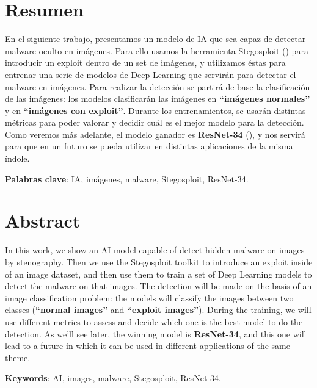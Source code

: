 \chapter{Resumen}

En el siguiente trabajo, presentamos un modelo de \ac{IA} que sea capaz de detectar malware oculto en imágenes. Para ello usamos la herramienta Stegosploit (\cite{stegosploit}) para introducir un exploit dentro de un set de imágenes, y utilizamos éstas para entrenar una serie de modelos de Deep Learning que servirán para detectar el malware en imágenes. Para realizar la detección se partirá de base la clasificación de las imágenes: los modelos clasificarán las imágenes en \textbf{``imágenes normales''} y en \textbf{``imágenes con exploit''}. Durante los entrenamientos, se usarán distintas métricas para poder valorar y decidir cuál es el mejor modelo para la detección. Como veremos más adelante, el modelo ganador es \textbf{ResNet-34} (\cite{resnet34}), y nos servirá para que en un futuro se pueda utilizar en distintas aplicaciones de la misma índole. %



\vspace{0.5cm}

\textbf{Palabras clave}: \ac{IA}, imágenes, malware, Stegosploit, ResNet-34.

\newpage
\thispagestyle{empty}
\hspace*{0.5cm}
\newpage

\chapter{Abstract}

In this work, we show an AI model capable of detect hidden malware on images by stenography. Then we use the Stegosploit toolkit to introduce an exploit inside of an image dataset, and then use them to train a set of Deep Learning models to detect the malware on that images. The detection will be made on the basis of an image classification problem: the models will classify the images between two classes (\textbf{``normal images''} and \textbf{``exploit images''}). During the training, we will use different metrics to assess and decide which one is the best model to do the detection. As we'll see later, the winning model is \textbf{ResNet-34}, and this one will lead to a future in which it can be used in different applications of the same theme.

\vspace{0.5cm}

\textbf{Keywords}: AI, images, malware, Stegosploit, ResNet-34.
\newpage
\thispagestyle{empty}
\hspace*{0.5cm}
\newpage
